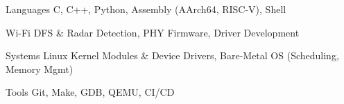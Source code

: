 

\begin{cvskills}

  \cvskill
    {Languages} %
    {C, C++, Python, Assembly (AArch64, RISC-V), Shell} %

  \cvskill
    {Wi-Fi} %
    {DFS \& Radar Detection, PHY Firmware, Driver Development} %

  \cvskill
    {Systems} %
    {Linux Kernel Modules \& Device Drivers, Bare-Metal OS (Scheduling, Memory Mgmt)} %

  \cvskill
    {Tools} %
    {Git, Make, GDB, QEMU, CI/CD} %

\end{cvskills}
